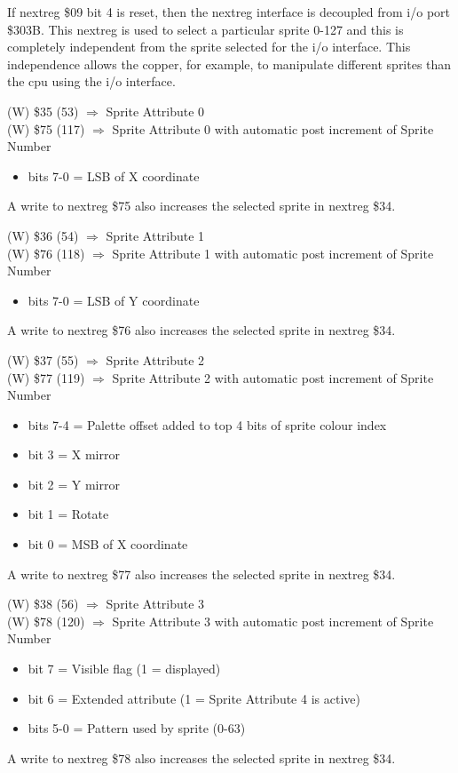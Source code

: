 If nextreg \$09 bit 4 is reset, then the nextreg interface is
decoupled from i/o port \$303B. This nextreg is used to select a
particular sprite 0-127 and this is completely independent from the
sprite selected for the i/o interface. This independence allows the
copper, for example, to manipulate different sprites than the cpu
using the i/o interface.

(W) \$35 (53) $\Rightarrow$ Sprite Attribute 0\\
(W) \$75 (117) $\Rightarrow$ Sprite Attribute 0 with automatic post
increment of Sprite Number
\begin{itemize}
\item[] bits 7-0 = LSB of X coordinate
\end{itemize}
A write to nextreg \$75 also increases the selected sprite in nextreg
\$34.

(W) \$36 (54) $\Rightarrow$ Sprite Attribute 1\\
(W) \$76 (118) $\Rightarrow$ Sprite Attribute 1 with automatic post
increment of Sprite Number
\begin{itemize}
\item[] bits 7-0 = LSB of Y coordinate
\end{itemize}
A write to nextreg \$76 also increases the selected sprite in nextreg
\$34.

(W) \$37 (55) $\Rightarrow$ Sprite Attribute 2\\
(W) \$77 (119) $\Rightarrow$ Sprite Attribute 2 with automatic post
increment of Sprite Number
\begin{itemize}
\item[] bits 7-4 = Palette offset added to top 4 bits of sprite colour
  index
\item[] bit 3 = X mirror
\item[] bit 2 = Y mirror
\item[] bit 1 = Rotate
\item[] bit 0 = MSB of X coordinate
\end{itemize}
A write to nextreg \$77 also increases the selected sprite in nextreg
\$34.

(W) \$38 (56) $\Rightarrow$ Sprite Attribute 3\\
(W) \$78 (120) $\Rightarrow$ Sprite Attribute 3 with automatic post
increment of Sprite Number
\begin{itemize}
\item[] bit 7 = Visible flag (1 = displayed)
\item[] bit 6 = Extended attribute (1 = Sprite Attribute 4 is active)
\item[] bits 5-0 = Pattern used by sprite (0-63)
\end{itemize}
A write to nextreg \$78 also increases the selected sprite in nextreg
\$34.

